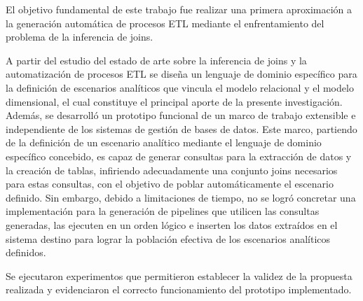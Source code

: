 \begin{conclusions}
    El objetivo fundamental de este trabajo fue realizar una primera aproximaci\'on a la generaci\'on 
    autom\'atica de procesos ETL mediante el enfrentamiento del problema de la inferencia de joins. 

    A partir del estudio del estado de arte sobre la inferencia de joins y la automatizaci\'on de procesos 
    ETL se diseña un lenguaje de dominio espec\'ifico para la definici\'on de escenarios anal\'iticos que 
    vincula el modelo relacional y el modelo dimensional, el cual constituye el principal aporte de la 
    presente investigaci\'on. Adem\'as, se desarrolló un prototipo funcional de un marco de trabajo extensible 
    e independiente de los sistemas de gestión de bases de datos. Este marco, partiendo de la definición de un 
    escenario analítico mediante el lenguaje de dominio específico concebido, es capaz de generar consultas para la 
    extracción 
    de datos y la creación de tablas, infiriendo adecuadamente una conjunto joins necesarios para estas consultas, 
    con el 
    objetivo de poblar automáticamente el escenario definido. Sin embargo, debido a limitaciones de tiempo, no se 
    logró concretar una implementación para la generación de pipelines que utilicen las consultas generadas, las 
    ejecuten en un orden lógico e inserten los datos extra\'idos en el sistema destino
    para lograr la población efectiva de los escenarios analíticos definidos.

    Se ejecutaron experimentos que permitieron establecer la validez de la propuesta realizada y evidenciaron el 
    correcto funcionamiento del prototipo implementado.
\end{conclusions}
